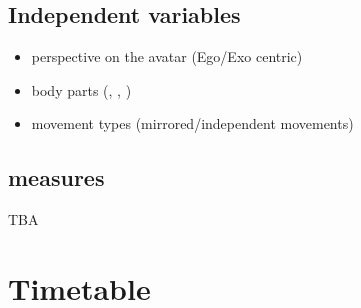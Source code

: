 \subsection{Independent variables}
\begin{itemize}
	\item perspective on the avatar (Ego/Exo centric)
	\item body parts (\UB, \LB, \FB)
	\item movement types (mirrored/independent movements)
\end{itemize}

\subsection{measures}
TBA

\section{Timetable}

\begin{comment}
\subsection{comments}
um \underline{Influence of Egocentric and Exocentric perspectives on Virtual Avatars during full-body and part-body mirrored and independent motor learning tasks} zu zeigen, muss ich dann nicht auch verschiedene lern systeme heranziehen? sonst zeige ich das ja nur für dieses eine lern system.

\end{comment}
